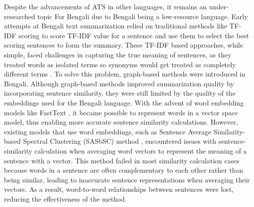 Despite the advancements of ATS in other languages, it remains an under-researched topic For Bengali due to Bengali being a low-resource language. Early attempts at Bengali text summarization relied on traditional methods like TF-IDF scoring \cite{Akter-2017-tfidf-3, das-2022-tfidf, sarkar-2012-tfidf, sarkar-2012-tfidf-2} to score TF-IDF value for a sentence and use them to select the best scoring sentences to form the summary. These TF-IDF based approaches, while simple, faced challenges in capturing the true meaning of sentences, as they treated words as isolated terms so synonyms would get treated as completely different terms \cite{tas-2017-rev-text-sum-2}. To solve this problem, graph-based methods were introduced in Bengali. Although graph-based methods improved summarization quality by incorporating sentence similarity, they were still limited by the quality of the embeddings used for the Bengali language. With the advent of word embedding models like FastText \cite{grave-etal-2018-fasttext}, it became possible to represent words in a vector space model, thus enabling more accurate sentence similarity calculations. However, existing models that use word embeddings, such as Sentence Average Similarity-based Spectral Clustering (SASbSC)  method \cite{roychowdhury-etal-2022-spectral-base}, encountered issues with sentence-similarity calculation  when averaging word vectors to represent the meaning of a sentence with a vector. This method failed in most similarity calculation cases because words in a sentence are often complementary to each other rather than being similar, leading to inaccurate sentence representations when averaging their vectors. As a result, word-to-word relationships between sentences were lost, reducing the effectiveness of the method.\\


